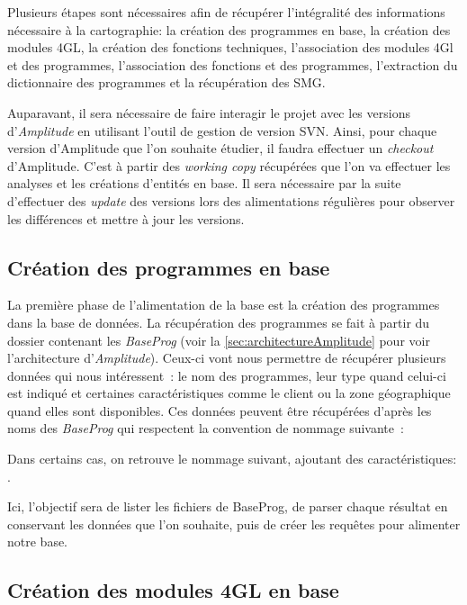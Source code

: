 \documentclass{polytech/polytech}
\begin{document}
Plusieurs étapes sont nécessaires afin de récupérer l'intégralité des informations nécessaire à la cartographie: la création des programmes en base, la création des modules 4GL, la création des fonctions techniques, l'association des modules 4Gl et des programmes, l'association des fonctions et des programmes, l'extraction du dictionnaire des programmes et la récupération des SMG.

Auparavant, il sera nécessaire de faire interagir le projet avec les versions d'\textit{Amplitude} en utilisant l'outil de gestion de version SVN. Ainsi, pour chaque version d’Amplitude que l’on souhaite étudier, il faudra effectuer un \textit{checkout} d’Amplitude. C’est à partir des \textit{working copy} récupérées que l’on va effectuer les analyses et les créations d’entités en base. Il sera nécessaire par la suite d’effectuer des \textit{update} des versions lors des alimentations régulières pour observer les différences et mettre à jour les versions. 

\subsection{Création des programmes en base}

La première phase de l’alimentation de la base est la création des programmes dans la base de données. La récupération des programmes se fait à partir du dossier contenant les \textit{BaseProg} (voir la \autoref{sec:architectureAmplitude} pour voir l'architecture d'\textit{Amplitude}). Ceux-ci vont nous permettre de récupérer plusieurs données qui nous intéressent : le nom des programmes, leur type quand celui-ci est indiqué et certaines caractéristiques comme le client ou la zone géographique quand elles sont disponibles. Ces données peuvent être récupérées d’après les noms des \textit{BaseProg} qui respectent la convention de nommage suivante : 

Dans certains cas, on retrouve le nommage suivant, ajoutant des caractéristiques: . 

Ici, l’objectif sera de lister les fichiers de BaseProg, de parser chaque résultat en conservant les données que l’on souhaite, puis de créer les requêtes pour alimenter notre base. 

\subsection{Création des modules 4GL en base}
\end{document}
